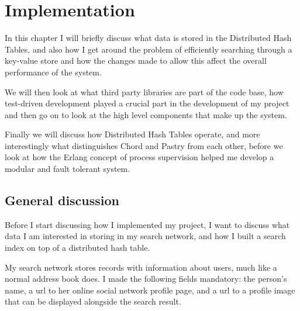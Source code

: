 

\section{Implementation}

In this chapter I will briefly discuss what data is stored in the Distributed Hash Tables, and also how I get around the problem of efficiently searching through a key-value store and how the changes made to allow this affect the overall performance of the system.

We will then look at what third party libraries are part of the code base, how test-driven development played a crucial part in the development of my project and then go on to look at the high level components that make up the system.

Finally we will discuss how Distributed Hash Tables operate, and more interestingly what distinguishes Chord and Pastry from each other, before we look at how the Erlang concept of process supervision helped me develop a modular and fault tolerant system.


\subsection{General discussion}
Before I start discussing how I implemented my project, I want to discuss what data I am interested in storing in my search network, and how I built a search index on top of a distributed hash table. 

\mbox{}

My search network stores records with information about users, much like a normal address book does. I made the following fields mandatory: the person's name, a url to her online social network profile page, and a url to a profile image that can be displayed alongside the search result.

